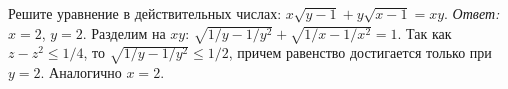 \problem
Решите уравнение в действительных числах:
$x \sqrt{y - 1} + y \sqrt{x - 1} = x y$.
\solution
\emph{Ответ:} $x = 2$, $y = 2$.
Разделим на $x y$:
$\sqrt{1 / y - 1 / y^2} + \sqrt{1 / x - 1 / x^2} = 1$.
Так как $z - z^2 \leq 1 / 4$, то $\sqrt{1 / y - 1 / y^2} \leq 1 / 2$, причем
равенство достигается только при $y = 2$.
Аналогично $x = 2$.
\endproblem
